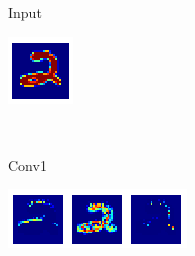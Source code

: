 \begin{frame}[plain]
\begin{figure}
\begin{subfigure}{0.1\textwidth}
\caption*{Input}
\end{subfigure}
\begin{subfigure}{0.1\textwidth}
\includegraphics[width=\textwidth]{deep_cnn_input}
\end{subfigure}
\\
\begin{subfigure}{0.1\textwidth}
\caption*{Conv1}
\end{subfigure}
\begin{subfigure}{0.3\textwidth}
\includegraphics[width=\textwidth]{deep_cnn_1_conv}
\end{subfigure}
\hspace{1cm}
\begin{subfigure}{0.3\textwidth}

\end{subfigure}
\end{figure}
\end{frame}
